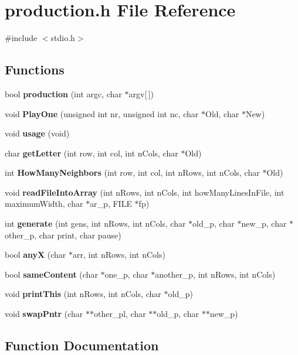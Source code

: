 \section{production.\+h File Reference}
\label{production_8h}
{\ttfamily \#include $<$stdio.\+h$>$}\newline
\subsection*{Functions}
\begin{DoxyCompactItemize}
\item 
bool \textbf{ production} (int argc, char $\ast$argv[$\,$])
\item 
void \textbf{ Play\+One} (unsigned int nr, unsigned int nc, char $\ast$Old, char $\ast$New)
\item 
void \textbf{ usage} (void)
\item 
char \textbf{ get\+Letter} (int row, int col, int n\+Cols, char $\ast$Old)
\item 
int \textbf{ How\+Many\+Neighbors} (int row, int col, int n\+Rows, int n\+Cols, char $\ast$Old)
\item 
void \textbf{ read\+File\+Into\+Array} (int n\+Rows, int n\+Cols, int how\+Many\+Lines\+In\+File, int maximum\+Width, char $\ast$ar\+\_\+p, F\+I\+LE $\ast$fp)
\item 
int \textbf{ generate} (int gens, int n\+Rows, int n\+Cols, char $\ast$old\+\_\+p, char $\ast$new\+\_\+p, char $\ast$other\+\_\+p, char print, char pause)
\item 
bool \textbf{ anyX} (char $\ast$arr, int n\+Rows, int n\+Cols)
\item 
bool \textbf{ same\+Content} (char $\ast$one\+\_\+p, char $\ast$another\+\_\+p, int n\+Rows, int n\+Cols)
\item 
void \textbf{ print\+This} (int n\+Rows, int n\+Cols, char $\ast$old\+\_\+p)
\item 
void \textbf{ swap\+Pntr} (char $\ast$$\ast$other\+\_\+pl, char $\ast$$\ast$old\+\_\+p, char $\ast$$\ast$new\+\_\+p)
\end{DoxyCompactItemize}


\subsection{Function Documentation}
\mbox{\label{production_8h_a85f4ceb7eddb00ab9989daf800a74d3f}} 
